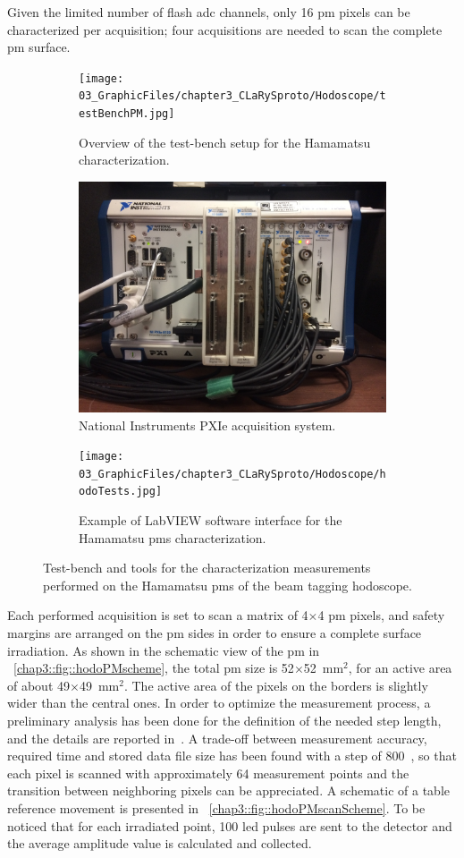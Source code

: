 Given the limited number of flash \gls{adc} channels, only 16 \gls{pm} pixels can be characterized per acquisition; four acquisitions are needed to scan the complete \gls{pm} surface.

 
\begin{figure}
\begin{subfigure}[t]{1\textwidth}
\centering
\texttt{[image: 03\_GraphicFiles/chapter3\_CLaRySproto/Hodoscope/testBenchPM.jpg]}
\caption{Overview of the test-bench setup for the Hamamatsu  characterization.}
\label{chap3::fig::hodo_testBenchPM}
\end{subfigure}
\newline
\begin{subfigure}[t]{.5\textwidth}
\centering
\includegraphics[width=1\textwidth, height = 5.cm]{03_GraphicFiles/chapter3_CLaRySproto/Electronics_Acquisition/PXI_ipnl.jpg}
\caption{National Instruments PXIe acquisition system.}
\label{chap3::fig::PXI_NI}
\end{subfigure}
\begin{subfigure}[t]{.5\textwidth}
\centering
\texttt{[image: 03\_GraphicFiles/chapter3\_CLaRySproto/Hodoscope/hodoTests.jpg]}
\caption{Example of LabVIEW software interface for the Hamamatsu 	\glspl{pm} characterization.}
\label{chap3::fig::hodo_LabView}
\end{subfigure}
\caption{Test-bench and tools for the characterization measurements performed on the Hamamatsu \glspl{pm} of the beam tagging hodoscope.}
\label{chap3::fig::hodoPMtest}
\end{figure}

Each performed acquisition is set to scan a matrix of 4$\times$4 \gls{pm} pixels, and safety margins are arranged on the \gls{pm} sides in order to ensure a complete surface irradiation. As shown in the schematic view of the \gls{pm} in \figurename~\ref{chap3::fig::hodoPMscheme}, the total \gls{pm} size is 52$\times$52~mm$^{2}$, for an active area of about 49$\times$49~mm$^{2}$. The active area of the pixels on the borders is slightly wider than the central ones. In order to optimize the measurement process, a preliminary analysis has been done for the definition of the needed step length, and the details are reported in~\cite{Coudurier2015}. A trade-off between measurement accuracy, required time and stored data file size has been found with a step of 800~\charmum, so that each pixel is scanned with approximately 64 measurement points and the transition between neighboring pixels can be appreciated. A schematic of a table reference movement is presented in \figurename~\ref{chap3::fig::hodoPMscanScheme}. To be noticed that for each irradiated point, 100 \gls{led} pulses are sent to the detector and the average amplitude value is calculated and collected.
 
